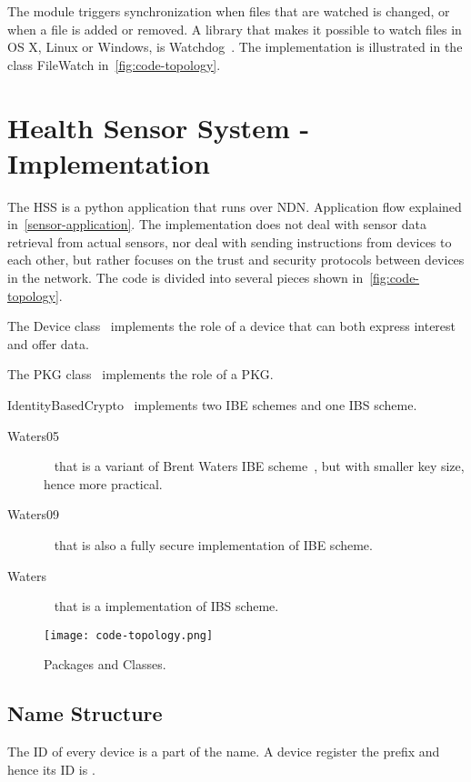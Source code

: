 The module triggers synchronization when files that are watched is changed, or when a file is added or removed.
A library that makes it possible to watch files in OS X, Linux or Windows, is Watchdog~\cite{watchdog}. 
The implementation is illustrated in the class FileWatch in~\autoref{fig:code-topology}.

\section{Health Sensor System - Implementation}
The \gls{HSS} is a python application that runs over \gls{NDN}.
Application flow explained in~\autoref{sensor-application}.
The implementation does not deal with sensor data retrieval from actual sensors, nor deal with sending instructions from devices to each other, but rather focuses on the trust and security protocols between devices in the network.
The code is divided into several pieces shown in~\autoref{fig:code-topology}.

The Device class~\cite[device.py]{garseg15} implements the role of a device that can both express \gls{interest} and offer \gls{data}.

The PKG class~\cite[publicKeyGenerator.py]{garseg15} implements the role of a \gls{PKG}.

IdentityBasedCrypto~\cite[identityBasedCrypto.py]{garseg15} implements two \gls{IBE} schemes and one \gls{IBS} scheme. 
\begin{description}
  \item[Waters05]~\cite{DBLP:journals/iacr/Naccache05} that is a variant of Brent Waters \gls{IBE} scheme~\cite{DBLP:journals/iacr/Waters04}, but with smaller key size, hence more practical.
  \item[Waters09]~\cite{DBLP:conf/crypto/Waters09} that is also a fully secure implementation of \gls{IBE} scheme.
  \item[Waters]~\cite{DBLP:journals/iacr/Waters04} that is a implementation of \gls{IBS} scheme.
\end{description}

\begin{figure}[ht]
  \centering
  \texttt{[image: code-topology.png]}
  \caption[Class topology]{Packages and Classes.}
  \label{fig:code-topology}
\end{figure}

\subsection{Name Structure}
The \gls{ID} of every device is a part of the \gls{name}.
A device register the prefix  and hence its \gls{ID} is .

